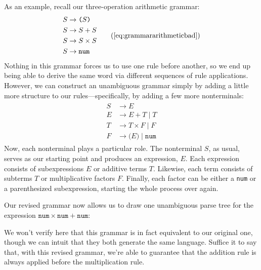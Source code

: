 As an example, recall our three-operation arithmetic grammar:
\begin{align}
\begin{split}
S	&\rightarrow \texttt{(} S \texttt{)} \\
S	&\rightarrow S + S \\
S	&\rightarrow S \times S \\
S	&\rightarrow \texttt{num}
\end{split}
\tag{\ref{eq:grammararithmeticbad}}
\end{align}
Nothing in this grammar forces us to use one rule before another, so we end up being able to derive the same word via different sequences of rule applications. However, we can construct an unambiguous grammar simply by adding a little more structure to our rules---specifically, by adding a few more nonterminals:
\begin{align}
\label{eq:grammararithmeticgood}
\begin{split}
S	&\rightarrow E \\
E	&\rightarrow E + T \mid T \\
T	&\rightarrow T \times F \mid F \\
F	&\rightarrow \texttt{(} E \texttt{)} \mid \texttt{num}
\end{split}
\end{align}
Now, each nonterminal plays a particular role. The nonterminal $S$, as usual, serves as our starting point and produces an expression, $E$. Each expression consists of subexpressions $E$ or additive terms $T$. Likewise, each term consists of subterms $T$ or multiplicative factors $F$. Finally, each factor can be either a \texttt{num} or a parenthesized subexpression, starting the whole process over again.

Our revised grammar now allows us to draw one unambiguous parse tree for the expression $\texttt{num} \times \texttt{num} + \texttt{num}$:

\begin{center}
\end{center}

We won't verify here that this grammar is in fact equivalent to our original one, though we can intuit that they both generate the same language. Suffice it to say that, with this revised grammar, we're able to guarantee that the addition rule is always applied before the multiplication rule.

